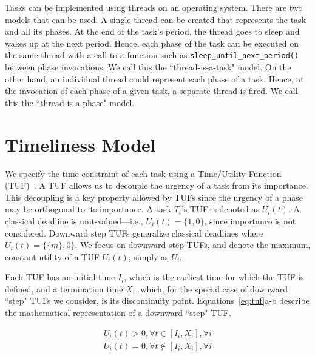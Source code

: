 \documentclass[12pt,dvips]{report}
\begin{document}
Tasks can be implemented using threads on an operating system. There are two models that can be used. A single thread can be created that represents the task and all its phases. At the end of the task's period, the thread goes to sleep and wakes up at the next period. Hence, each phase of the task can be executed on the same thread with a call to a function such as \texttt{sleep\_until\_next\_period()} between phase invocations. We call this the ``thread-is-a-task" model. On the other hand, an individual thread could represent each phase of a task. Hence, at the invocation of each phase of a given task, a separate thread is fired. We call this the ``thread-is-a-phase" model.

\section{Timeliness Model}
We specify the time constraint of each task using a Time/Utility Function (TUF)~\cite{TUFjensen85time}. A TUF allows us to decouple the urgency of a task from its importance. This decoupling is a key property allowed by TUFs since the urgency of a phase may be orthogonal to its importance. A task $T_i$'s TUF is denoted as $U_i \left(t \right)$. A classical deadline is unit-valued---i.e., $U_i(t) = \{1,0\}$, since importance is not considered. Downward step TUFs generalize classical deadlines where $U_i(t) = \{\{m\},0\}$. We focus on downward step TUFs, and denote the maximum, constant utility of a TUF $U_i \left(t \right)$, simply as $U_i$. 

Each TUF has an initial time $I_i$, which is the earliest time for which the TUF is defined, and a termination time $X_i$, which, for the special case of downward ``step" TUFs we consider, is its discontinuity point. Equations~\ref{eq:tuf}a-b describe the mathematical representation of a downward ``step" TUF.

\begin{subequations}
	\label{eq:tuf}
	\begin{align}
		U_i \left( t \right) > 0,\forall t \in \left[ {I_i ,X_i } \right], \forall i \\
		U_i \left( t \right) = 0,\forall t \notin \left[ {I_i ,X_i} \right], \forall i
	\end{align}
\end{subequations}
\end{document}
